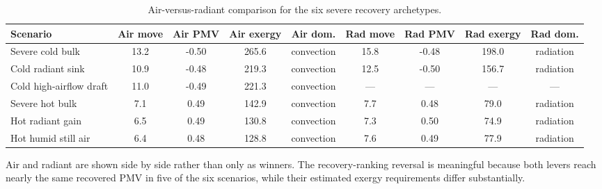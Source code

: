 \begin{table}[t]
\centering
\caption{Air-versus-radiant comparison for the six severe recovery archetypes.}
\label{tab:outcomes}
\begin{adjustbox}{max width=\textwidth}
\begin{tabular}{p{2.5cm}cccccccc}
\toprule
Scenario & Air move & Air PMV & Air exergy & Air dom. & Rad move & Rad PMV & Rad exergy & Rad dom. \\
\midrule
Severe cold bulk & 13.2 & -0.50 & 265.6 & convection & 15.8 & -0.48 & 198.0 & radiation \\
Cold radiant sink & 10.9 & -0.48 & 219.3 & convection & 12.5 & -0.50 & 156.7 & radiation \\
Cold high-airflow draft & 11.0 & -0.49 & 221.3 & convection & — & — & — & — \\
Severe hot bulk & 7.1 & 0.49 & 142.9 & convection & 7.7 & 0.48 & 79.0 & radiation \\
Hot radiant gain & 6.5 & 0.49 & 130.8 & convection & 7.3 & 0.50 & 74.9 & radiation \\
Hot humid still air & 6.4 & 0.48 & 128.8 & convection & 7.6 & 0.49 & 77.9 & radiation \\
\bottomrule
\end{tabular}
\end{adjustbox}
\begin{flushleft}\footnotesize Air and radiant are shown side by side rather than only as winners. The recovery-ranking reversal is meaningful because both levers reach nearly the same recovered PMV in five of the six scenarios, while their estimated exergy requirements differ substantially.\end{flushleft}
\end{table}
